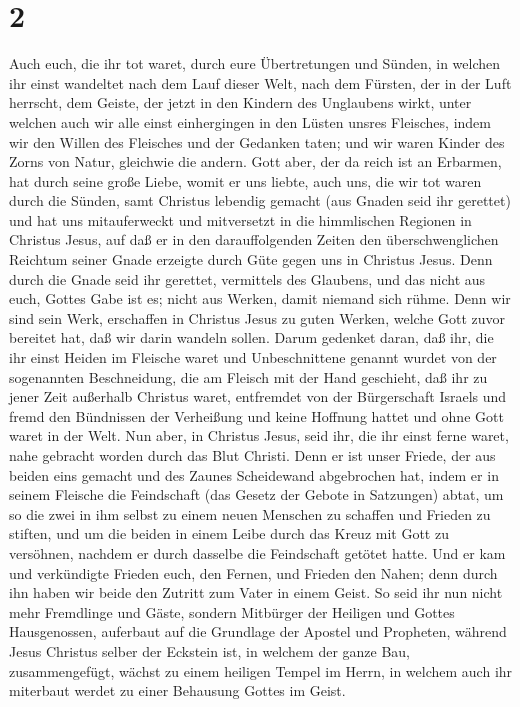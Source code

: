 \hypertarget{section-1}{%
\section{2}\label{section-1}}

 Auch euch, die ihr tot waret, durch eure Übertretungen
und Sünden,  in welchen ihr einst wandeltet nach dem Lauf
dieser Welt, nach dem Fürsten, der in der Luft herrscht, dem Geiste, der
jetzt in den Kindern des Unglaubens wirkt,  unter welchen
auch wir alle einst einhergingen in den Lüsten unsres Fleisches, indem
wir den Willen des Fleisches und der Gedanken taten; und wir waren
Kinder des Zorns von Natur, gleichwie die andern.  Gott
aber, der da reich ist an Erbarmen, hat durch seine große Liebe, womit
er uns liebte,  auch uns, die wir tot waren durch die
Sünden, samt Christus lebendig gemacht (aus Gnaden seid ihr gerettet)
 und hat uns mitauferweckt und mitversetzt in die
himmlischen Regionen in Christus Jesus,  auf daß er in den
darauffolgenden Zeiten den überschwenglichen Reichtum seiner Gnade
erzeigte durch Güte gegen uns in Christus Jesus.  Denn
durch die Gnade seid ihr gerettet, vermittels des Glaubens, und das
nicht aus euch, Gottes Gabe ist es;  nicht aus Werken,
damit niemand sich rühme.  Denn wir sind sein Werk,
erschaffen in Christus Jesus zu guten Werken, welche Gott zuvor bereitet
hat, daß wir darin wandeln sollen.  Darum gedenket daran,
daß ihr, die ihr einst Heiden im Fleische waret und Unbeschnittene
genannt wurdet von der sogenannten Beschneidung, die am Fleisch mit der
Hand geschieht,  daß ihr zu jener Zeit außerhalb Christus
waret, entfremdet von der Bürgerschaft Israels und fremd den Bündnissen
der Verheißung und keine Hoffnung hattet und ohne Gott waret in der
Welt.  Nun aber, in Christus Jesus, seid ihr, die ihr
einst ferne waret, nahe gebracht worden durch das Blut Christi.
 Denn er ist unser Friede, der aus beiden eins gemacht
und des Zaunes Scheidewand abgebrochen hat,  indem er in
seinem Fleische die Feindschaft (das Gesetz der Gebote in Satzungen)
abtat, um so die zwei in ihm selbst zu einem neuen Menschen zu schaffen
und Frieden zu stiften,  und um die beiden in einem Leibe
durch das Kreuz mit Gott zu versöhnen, nachdem er durch dasselbe die
Feindschaft getötet hatte.  Und er kam und verkündigte
Frieden euch, den Fernen, und Frieden den Nahen;  denn
durch ihn haben wir beide den Zutritt zum Vater in einem Geist.
 So seid ihr nun nicht mehr Fremdlinge und Gäste, sondern
Mitbürger der Heiligen und Gottes Hausgenossen, 
auferbaut auf die Grundlage der Apostel und Propheten, während Jesus
Christus selber der Eckstein ist,  in welchem der ganze
Bau, zusammengefügt, wächst zu einem heiligen Tempel im Herrn,
 in welchem auch ihr miterbaut werdet zu einer Behausung
Gottes im Geist.

